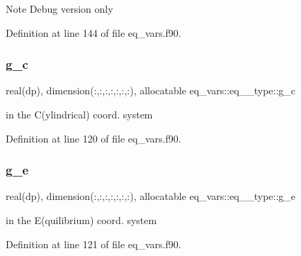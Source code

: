 \begin{DoxyNote}{Note}
Debug version only 
\end{DoxyNote}


Definition at line 144 of file eq\+\_\+vars.\+f90.

\mbox{\label{structeq__vars_1_1eq__2__type_a802c4087efeb67ea5fb5d837267af4b1}} 
\subsubsection{\texorpdfstring{g\+\_\+c}{g\_c}}
{\footnotesize\ttfamily real(dp), dimension(\+:,\+:,\+:,\+:,\+:,\+:,\+:), allocatable eq\+\_\+vars\+::eq\+\_\+\_\+type\+::g\+\_\+c}



in the C(ylindrical) coord. system 



Definition at line 120 of file eq\+\_\+vars.\+f90.

\mbox{\label{structeq__vars_1_1eq__2__type_a19309c67f2334ff898d3eef1a9b1b1da}} 
\subsubsection{\texorpdfstring{g\+\_\+e}{g\_e}}
{\footnotesize\ttfamily real(dp), dimension(\+:,\+:,\+:,\+:,\+:,\+:,\+:), allocatable eq\+\_\+vars\+::eq\+\_\+\_\+type\+::g\+\_\+e}



in the E(quilibrium) coord. system 



Definition at line 121 of file eq\+\_\+vars.\+f90.

\mbox{\label{structeq__vars_1_1eq__2__type_a86af2ae617633d732fbb3927f10b62d4}} 
